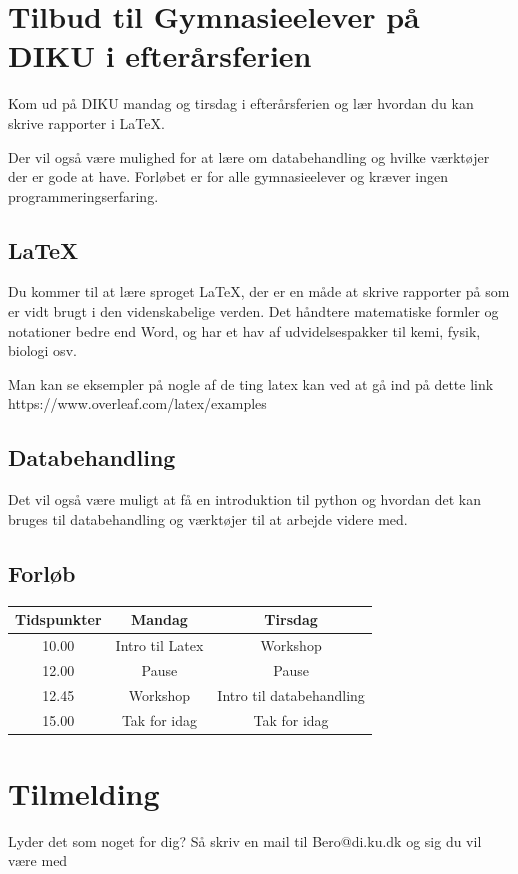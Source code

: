 \documentclass[14pt]{article}
\begin{document}
    \newpage                %
    \setcounter{page}{1}    %
\section*{Tilbud til Gymnasieelever på DIKU i efterårsferien}
Kom ud på DIKU mandag og tirsdag i efterårsferien og lær hvordan du kan skrive
rapporter i LaTeX.

Der vil også være mulighed for at lære om databehandling og hvilke værktøjer der
er gode at have. Forløbet er for alle gymnasieelever og kræver ingen
programmeringserfaring.
\subsection*{LaTeX}
    Du kommer til at lære sproget LaTeX, der er en måde at skrive rapporter på
    som er vidt brugt i den videnskabelige verden. Det håndtere matematiske
    formler og notationer bedre end Word, og har et hav af udvidelsespakker til
    kemi, fysik, biologi osv.

    Man kan se eksempler på nogle af de ting latex kan ved at gå ind på dette
    link https://www.overleaf.com/latex/examples

\subsection*{Databehandling}
Det vil også være muligt at få en introduktion til python og hvordan det kan
bruges til databehandling og værktøjer til at arbejde videre med.

\subsection*{Forløb}

\Large{
\begin{center}
\begin{tabular}{ c || c | c }
    Tidspunkter &  Mandag & Tirsdag \\
    \hline
    10.00 & Intro til Latex & Workshop \\
    12.00 & Pause           & Pause \\
    12.45 & Workshop        & Intro til databehandling \\
    15.00 & Tak for idag    & Tak for idag \\
\end{tabular}
\end{center}
}

\section*{Tilmelding}
Lyder det som noget for dig? Så skriv en mail til Bero@di.ku.dk og sig du vil være med
\end{document}
